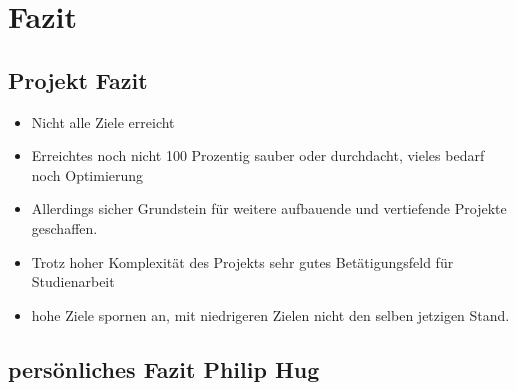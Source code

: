 \chapter{Fazit}

\section{Projekt Fazit}
\begin{itemize}
\item Nicht alle Ziele erreicht
\item Erreichtes noch nicht 100 Prozentig sauber oder durchdacht, vieles bedarf noch Optimierung
\item Allerdings sicher Grundstein für weitere aufbauende und vertiefende Projekte geschaffen.
\item Trotz hoher Komplexität des Projekts sehr gutes Betätigungsfeld für Studienarbeit
\item hohe Ziele spornen an, mit niedrigeren Zielen nicht den selben jetzigen Stand.
\end{itemize}

\section{persönliches Fazit Philip Hug}

